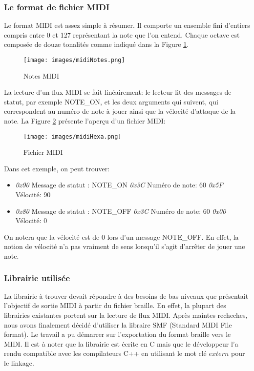 \subsubsection{Le format de fichier MIDI}
Le format MIDI est assez simple à résumer. Il comporte un ensemble fini d'entiers compris entre 0 et 127 représentant la note que l'on entend. Chaque octave est composée de douze tonalités comme indiqué dans la Figure \ref{midiNote}.  
\begin{figure}[h]
\centering
\texttt{[image: images/midiNotes.png]}
\caption{Notes MIDI}
\label{midiNote}
\end{figure}

La lecture d'un flux MIDI se fait linéairement: le lecteur lit des messages de statut, par exemple NOTE\_ON, et les deux arguments qui suivent, qui correspondent au numéro de note à jouer ainsi que la vélocité d'attaque de la note. La Figure \ref{midiHexa} présente l'aperçu d'un fichier MIDI:
\begin{figure}[h]
\centering
\texttt{[image: images/midiHexa.png]}
\caption{Fichier MIDI}
\label{midiHexa}
\end{figure}

Dans cet exemple, on peut trouver:
\begin{itemize}
\item \textit{0x90} Message de statut : NOTE\_ON \textit{0x3C} Numéro de note: 60 \textit{0x5F} Vélocité: 90
\item \textit{0x80} Message de statut : NOTE\_OFF \textit{0x3C} Numéro de note: 60 \textit{0x00} Vélocité: 0
\end{itemize}
On notera que la vélocité est de 0 lors d'un message NOTE\_OFF. En effet, la notion de vélocité n'a pas vraiment de sens lorsqu'il s'agit d'arrêter de jouer une note.

\subsubsection{Librairie utilisée}
La librairie à trouver devait répondre à des besoins de bas niveaux que présentait l'objectif de sortie MIDI à partir du fichier braille. En effet, la plupart des librairies existantes portent sur la lecture de flux MIDI. Après maintes recheches, nous avons finalement décidé d'utiliser la libraire SMF (Standard MIDI File format). Le travail a pu démarrer sur l'exportation du format braille vers le MIDI. Il est à noter que la librairie est écrite en C mais que le développeur l'a rendu compatible avec les compilateurs C++ en utilisant le mot clé $extern$ pour le linkage.

